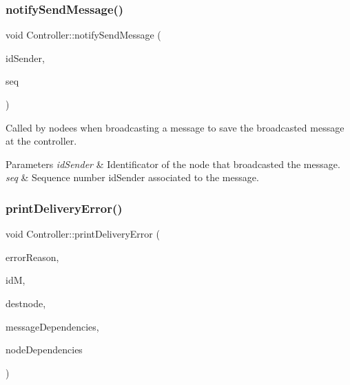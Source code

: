 \subsubsection{\texorpdfstring{notify\+Send\+Message()}{notifySendMessage()}}
{\footnotesize\ttfamily void Controller\+::notify\+Send\+Message (\begin{DoxyParamCaption}\item[{unsigned int}]{id\+Sender,  }\item[{unsigned int}]{seq }\end{DoxyParamCaption})}



Called by nodees when broadcasting a message to save the broadcasted message at the controller. 


\begin{DoxyParams}{Parameters}
{\em id\+Sender} & Identificator of the node that broadcasted the message. \\
\hline
{\em seq} & Sequence number id\+Sender associated to the message. \\
\hline
\end{DoxyParams}
\mbox{\label{class_controller_aa3c4ebef8d344e10e86c1b4f95171281}} 
\subsubsection{\texorpdfstring{print\+Delivery\+Error()}{printDeliveryError()}}
{\footnotesize\ttfamily void Controller\+::print\+Delivery\+Error (\begin{DoxyParamCaption}\item[{string}]{error\+Reason,  }\item[{\hyperlink{structures_8h_a83a1d9a070efa5341da84cfd8e28d3e5}{id\+Msg}}]{idM,  }\item[{unsigned int}]{destnode,  }\item[{const \hyperlink{class_total_dependencies}{Total\+Dependencies} \&}]{message\+Dependencies,  }\item[{const \hyperlink{class_total_dependencies}{Total\+Dependencies} \&}]{node\+Dependencies }\end{DoxyParamCaption})\hspace{0.3cm}{\ttfamily [private]}}



